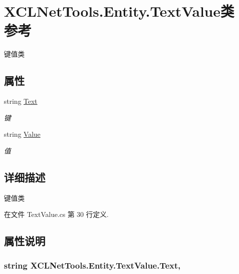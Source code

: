 \hypertarget{class_x_c_l_net_tools_1_1_entity_1_1_text_value}{\section{X\-C\-L\-Net\-Tools.\-Entity.\-Text\-Value类 参考}
\label{class_x_c_l_net_tools_1_1_entity_1_1_text_value}
}


键值类  


\subsection*{属性}
\begin{DoxyCompactItemize}
\item 
string \hyperlink{class_x_c_l_net_tools_1_1_entity_1_1_text_value_a56860ac04aa98fbb3e41e5b451d16c4a}{Text}
\begin{DoxyCompactList}\small\item\em 键 \end{DoxyCompactList}\item 
string \hyperlink{class_x_c_l_net_tools_1_1_entity_1_1_text_value_a8a193486b942adc898433bd29db3eff7}{Value}
\begin{DoxyCompactList}\small\item\em 值 \end{DoxyCompactList}\end{DoxyCompactItemize}


\subsection{详细描述}
键值类 



在文件 Text\-Value.\-cs 第 30 行定义.



\subsection{属性说明}
\hypertarget{class_x_c_l_net_tools_1_1_entity_1_1_text_value_a56860ac04aa98fbb3e41e5b451d16c4a}{
\subsubsection[{Text}]{\setlength{\rightskip}{0pt plus 5cm}string X\-C\-L\-Net\-Tools.\-Entity.\-Text\-Value.\-Text\hspace{0.3cm}{\ttfamily [get]}, {\ttfamily [set]}}}\label{class_x_c_l_net_tools_1_1_entity_1_1_text_value_a56860ac04aa98fbb3e41e5b451d16c4a}


